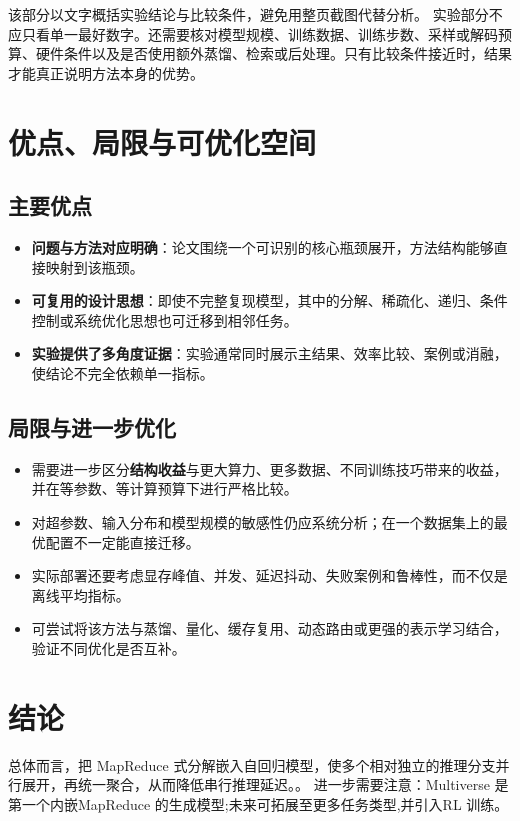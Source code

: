 \documentclass[UTF8,11pt,a4paper]{ctexart}
\newcommand{\term}[1]{\textbf{\textcolor{mainblue}{#1}}}
\begin{document}
该部分以文字概括实验结论与比较条件，避免用整页截图代替分析。
实验部分不应只看单一最好数字。还需要核对模型规模、训练数据、训练步数、采样或解码预算、硬件条件以及是否使用额外蒸馏、检索或后处理。只有比较条件接近时，结果才能真正说明方法本身的优势。

\section{优点、局限与可优化空间}
\subsection{主要优点}
\begin{itemize}
\item \term{问题与方法对应明确}：论文围绕一个可识别的核心瓶颈展开，方法结构能够直接映射到该瓶颈。
\item \term{可复用的设计思想}：即使不完整复现模型，其中的分解、稀疏化、递归、条件控制或系统优化思想也可迁移到相邻任务。
\item \term{实验提供了多角度证据}：实验通常同时展示主结果、效率比较、案例或消融，使结论不完全依赖单一指标。
\end{itemize}

\subsection{局限与进一步优化}
\begin{itemize}
\item 需要进一步区分\term{结构收益}与更大算力、更多数据、不同训练技巧带来的收益，并在等参数、等计算预算下进行严格比较。
\item 对超参数、输入分布和模型规模的敏感性仍应系统分析；在一个数据集上的最优配置不一定能直接迁移。
\item 实际部署还要考虑显存峰值、并发、延迟抖动、失败案例和鲁棒性，而不仅是离线平均指标。
\item 可尝试将该方法与蒸馏、量化、缓存复用、动态路由或更强的表示学习结合，验证不同优化是否互补。
\end{itemize}

\section{结论}
总体而言，把 MapReduce 式分解嵌入自回归模型，使多个相对独立的推理分支并行展开，再统一聚合，从而降低串行推理延迟。。 进一步需要注意：Multiverse 是第一个内嵌MapReduce 的生成模型;未来可拓展至更多任务类型,并引入RL 训练。
\end{document}
